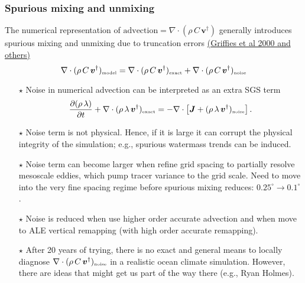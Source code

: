 \documentclass[10pt]{beamer}
\begin{document}
\begin{frame}
  \frametitle{Spurious mixing and unmixing}

  The numerical representation of
  $\mbox{advection} = \nabla \cdot ( \rho \, C \, {\bm v}^{\dagger})$
  generally introduces spurious mixing and unmixing due to truncation
  errors
  \href{https://doi.org/10.1175/1520-0493(2000)128<0538:SDMAWA>2.0.CO;2}{(Griffies
    et al 2000 and others)}
\begin{equation}
   \nabla \cdot ( \rho \, C \, {\bm v}^{\dagger})_{\mbox{\tiny model}} = 
   \nabla \cdot ( \rho \, C \, {\bm v}^{\dagger})_{\mbox{\tiny exact}} 
  +
 \nabla \cdot ( \rho \, C \, {\bm v}^{\dagger})_{\mbox{\tiny noise}}
\end{equation}

\begin{exampleblock}{}
\begin{itemize}
\item[$\star$] Noise in numerical advection can be interpreted as an
  extra SGS term
\begin{equation}
   \frac{\partial (\rho \, \lambda)}{\partial t} + \nabla \cdot (\rho \, \lambda \, {\bm v}^{\dagger} )_{\mbox{\tiny exact}} 
 = -\nabla \cdot \left[  {\bm J} + (\rho \, \lambda \, {\bm v}^{\dagger} )_{\mbox{\tiny noise}} \right]. 
\end{equation}

\item[$\star$] Noise term is not physical.  Hence, if it is large it
  can corrupt the physical integrity of the simulation; e.g.,
  spurious watermass trends can be induced.

\item[$\star$] Noise term can become larger when refine grid spacing
  to partially resolve mesoscale eddies, which pump tracer variance to
  the grid scale.  Need to move into the very fine spacing regime
  before spurious mixing reduces:
  $0.25^{\circ} \longrightarrow 0.1^{\circ}$.

\item[$\star$] Noise is reduced when use higher order accurate
  advection and when move to ALE vertical remapping (with high order
  accurate remapping). 

\item[$\star$] After 20 years of trying, there is no exact and general
  means to locally diagnose
  $\nabla \cdot ( \rho \, C \, {\bm v}^{\dagger})_{\mbox{\tiny
      noise}}$
  in a realistic ocean climate simulation.  However, there are ideas
  that might get us part of the way there (e.g., Ryan Holmes).

\end{itemize}
\end{exampleblock}{}


\end{frame}
\end{document}
